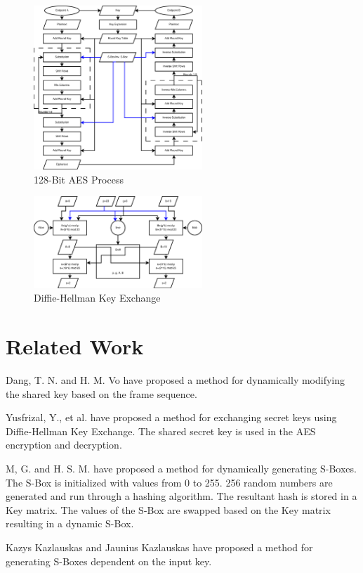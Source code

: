 \documentclass[journal]{IEEEtran}
\begin{document}
\begin{figure}[!t]
	\centering
	\includegraphics[width=2.5in]{AESProcess}
	\caption{128-Bit AES Process}
	\label{Figure:AESProcess}
\end{figure}
\begin{figure}[!t]
	\centering
	\includegraphics[width=2.5in]{DiffieHellman}
	\caption{Diffie-Hellman Key Exchange}
	\label{Figure:DiffieHellman}
\end{figure}

\section{Related Work}

\cite{AESDynamicKey} Dang, T. N. and H. M. Vo have proposed a method for dynamically modifying the 
shared key based on the frame sequence.

\cite{AESDiffieHellman} Yusfrizal, Y., et al. have proposed a method for exchanging secret keys using
Diffie-Hellman Key Exchange. The shared secret key is used in the AES encryption and decryption.

\cite{AESDynamicSBox} M, G. and H. S. M. have proposed a method for dynamically generating S-Boxes. 
The S-Box is initialized with values from 0 to 255. 256 random numbers are generated and run through 
a hashing algorithm. The resultant hash is stored in a Key matrix. The values of the S-Box are swapped 
based on the Key matrix resulting in a dynamic S-Box. 

\cite{AESKeySBox} Kazys Kazlauskas and Jaunius Kazlauskas have proposed a method for generating S-Boxes dependent on the input key.
\end{document}
